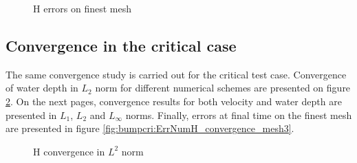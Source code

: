 \begin{figure}[H]
\centering
  \caption{H errors on finest mesh}
\label{fig:bump:ErrNumH_convergence_mesh3}
\end{figure}


\subsection{Convergence in the critical case}

The same convergence study is carried out for the critical test case.
Convergence of water depth in $L_2$ norm for different numerical schemes are presented on figure \ref{fig:bumpcri:ErrNumH_convergence}. On the next pages, convergence results for both velocity and water depth
are presented in $L_1$, $L_2$ and $L_{\infty}$ norms. Finally, errors at final time on the finest mesh are presented in figure \ref{fig:bumpcri:ErrNumH_convergence_mesh3}.

\begin{figure}[H]
\centering
  \caption{H convergence in $L^2$ norm}
\label{fig:bumpcri:ErrNumH_convergence}
\end{figure}

